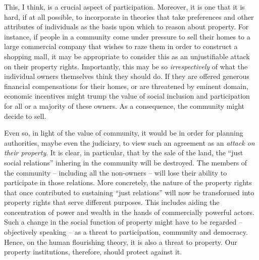 \documentclass[12pt,a4paper]{book} %
\begin{document}
This, I think, is a crucial aspect of participation. Moreover, it is one that it is hard, if at all possible, to incorporate in theories that take  preferences and other attributes of individuals as the basis upon which to reason about property. For instance, if people in a community come under pressure to sell their homes to a large commercial company that wishes to raze them in order to construct a shopping mall, it may be appropriate to consider this as an unjustifiable attack on their property rights. Importantly, this may be so {\it irrespectively} of what the individual owners themselves think they should do. If they are offered generous financial compensations for their homes, or are threatened by eminent domain, economic incentives might trump the value of social inclusion and participation for all or a majority of these owners. As a consequence, the community might decide to sell.  

Even so, in light of the value of community, it would be in order for planning authorities, maybe even the judiciary, to view such an  agreement as an {\it attack on their property}. It is clear, in particular, that by the sale of the land, the ``just social relations'' inhering in the community will be destroyed. The members of the community -- including all the non-owners -- will lose their ability to participate in those relations. More concretely, the nature of the property rights that once contributed to sustaining ``just relations'' will now be transformed into property rights that serve different purposes. This includes aiding the concentration of power and wealth in the hands of commercially powerful actors. Such a change in the social function of property might have to be regarded -- objectively speaking -- as a threat to participation, community and democracy. Hence, on the human flourishing theory, it is also a threat to property. Our property institutions, therefore, should protect against it.
\end{document}
